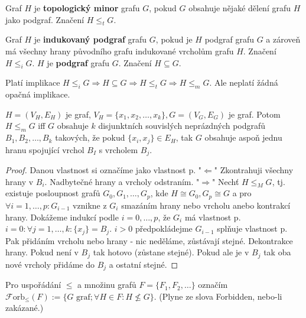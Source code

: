 \begin{definice}
	Graf $H$ je \textbf{topologický minor} grafu $G$, pokud $G$ obsahuje nějaké dělení grafu $H$ jako podgraf. Značení $H \leq_{t} G$.
\end{definice}

\begin{definice}
	Graf $H$ je \textbf{indukovaný podgraf} grafu $G$, pokud je $H$ podgraf grafu $G$ a zároveň má všechny hrany původního grafu indukované vrcholům grafu $H$. Značení $H \leq_{i} G$. $H$ je \textbf{podgraf} grafu $G$. Značení $H \subseteq G$.
\end{definice}

\begin{pozor}
	Platí implikace $H \leq_{i} G \Rightarrow H \subseteq G \Rightarrow H \leq_{t} G \Rightarrow H \leq_{m} G$. Ale neplatí žádná opačná implikace.
\end{pozor}

\begin{lemma}
	$H = (V_{H}, E_{H})$ je graf, $V_{H} = \{x_{1}, x_{2}, \dots, x_{k}\}, G=(V_{G},E_{G})$ je graf. Potom $H \leq_{m} G$ iff $G$ obsahuje $k$ disjunktních souvislých neprázdných podgrafů $B_{1}, B_{2}, \dots , B_{k}$ takových, že pokud $\{x_{i}, x_{j}\} \in E_{H}$, tak $G$ obsahuje aspoň jednu hranu spojující vrchol $B_{I}$ s vrcholem $B_{j}$.
\end{lemma}

\begin{proof}
	Danou vlastnost si označíme jako vlastnost p. "$\Leftarrow$" Zkontrahuji všechny hrany v $B_{i}$. Nadbytečné hrany a vrcholy odstraním. "$\Rightarrow$" Nechť $H \leq_{M} G$, tj. existuje posloupnost grafů $G_{0}, G_{1}, \dots ,G_{p}$, kde $H \cong G_{0}, G_{p} \cong G$ a pro $\forall i = 1, \dots, p: G_{i-1}$ vznikne z $G_{i}$ smazáním hrany nebo vrcholu anebo kontrakcí hrany. Dokážeme indukcí podle $i = 0, \dots, p$, že $G_{i}$ má vlastnost p. $i = 0: \forall j = 1, \dots ,k: \{x_{j}\} = B_{j}$. $i > 0$ předpokládejme $G_{i-1}$ splňuje vlastnost p. Pak přidáním vrcholu nebo hrany - nic neděláme, zůstávají stejné. Dekontrakce hrany. Pokud není v $B_{j}$ tak hotovo (zůstane stejné). Pokud ale je v $B_{j}$ tak oba nové vrcholy přidáme do $B_{j}$ a ostatní stejné.
\end{proof}

\begin{definice}
	Pro uspořádání $\leq$ a množinu grafů $F = \{F_{1}, F_{2}, \dots\}$ označím $\mathcal{F}\text{orb}_{\leq}(F) := \{G \text{ graf}; \forall H \in F: H \nleq G\}$. (Plyne ze slova Forbidden, nebo-li zakázané.)
\end{definice}

